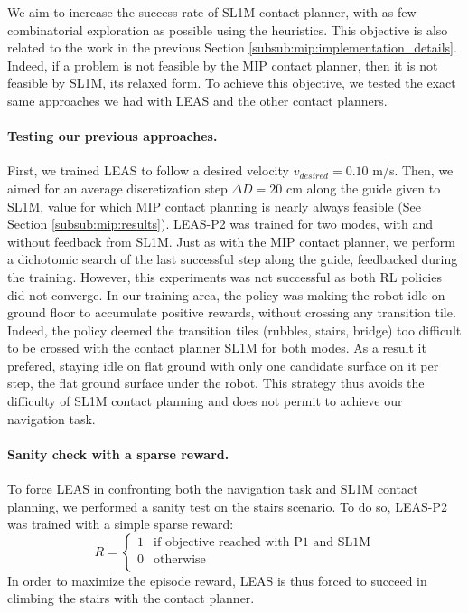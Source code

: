 We aim to increase the success rate of SL1M contact planner, with as few combinatorial exploration as possible using the heuristics.
This objective is also related to the work in the previous Section \ref{subsub:mip:implementation_details}. 
Indeed, if a problem is not feasible by the MIP contact planner, then it is not feasible by SL1M, its relaxed form.
To achieve this objective, we tested the exact same approaches we had with LEAS and the other contact planners.

\paragraph{Testing our previous approaches.}
First, we trained LEAS to follow a desired velocity $v_{desired}=0.10$ m/s. 
Then, we aimed for an average discretization step $\Delta D=20$ cm along the guide given to SL1M, value for which MIP contact planning is nearly always feasible (See Section \ref{subsub:mip:results}).
LEAS-P2 was trained for two modes, with and without feedback from SL1M. Just as with the MIP contact planner, we perform a dichotomic search of the last successful step along the guide, feedbacked during the training.
However, this experiments was not successful as both RL policies did not converge.
In our training area, the policy was making the robot idle on ground floor to accumulate positive rewards, without crossing any transition tile. 
Indeed, the policy deemed the transition tiles (rubbles, stairs, bridge) too difficult to be crossed with the contact planner SL1M for both modes.
As a result it prefered, staying idle on flat ground with only one candidate surface on it per step, the flat ground surface under the robot.
This strategy thus avoids the difficulty of SL1M contact planning and does not permit to achieve our navigation task.


\paragraph{Sanity check with a sparse reward.}
To force LEAS in confronting both the navigation task and SL1M contact planning, we performed a sanity test on the stairs scenario.
To do so, LEAS-P2 was trained with a simple sparse reward:
\begin{equation}
    R = \left\{
    \begin{array}{ll}
        1 & \mbox{if objective reached with P1 and SL1M}\\
        0 & \mbox{otherwise}\\
    \end{array}
\right.
\end{equation}
In order to maximize the episode reward, LEAS is thus forced to succeed in climbing the stairs with the contact planner.

